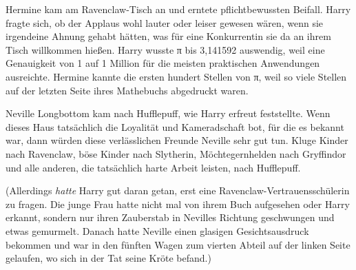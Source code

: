 Hermine kam am Ravenclaw-Tisch an und erntete pflichtbewussten Beifall. Harry fragte sich, ob der Applaus wohl lauter oder leiser gewesen wären, wenn sie irgendeine Ahnung gehabt hätten, was für eine Konkurrentin sie da an ihrem Tisch willkommen hießen. Harry wusste π bis 3,141592 auswendig, weil eine Genauigkeit von 1 auf 1 Million für die meisten praktischen Anwendungen ausreichte. Hermine kannte die ersten hundert Stellen von π, weil so viele Stellen auf der letzten Seite ihres Mathebuchs abgedruckt waren.

Neville Longbottom kam nach Hufflepuff, wie Harry erfreut feststellte. Wenn dieses Haus tatsächlich die Loyalität und Kameradschaft bot, für die es bekannt war, dann würden diese verlässlichen Freunde Neville sehr gut tun. Kluge Kinder nach Ravenclaw, böse Kinder nach Slytherin, Möchtegernhelden nach Gryffindor und alle anderen, die tatsächlich harte Arbeit leisten, nach Hufflepuff.

(Allerdings \emph{hatte} Harry gut daran getan, erst eine Ravenclaw-Vertrauensschülerin zu fragen. Die junge Frau hatte nicht mal von ihrem Buch aufgesehen oder Harry erkannt, sondern nur ihren Zauberstab in Nevilles Richtung geschwungen und etwas gemurmelt. Danach hatte Neville einen glasigen Gesichtsausdruck bekommen und war in den fünften Wagen zum vierten Abteil auf der linken Seite gelaufen, wo sich in der Tat seine Kröte befand.)

